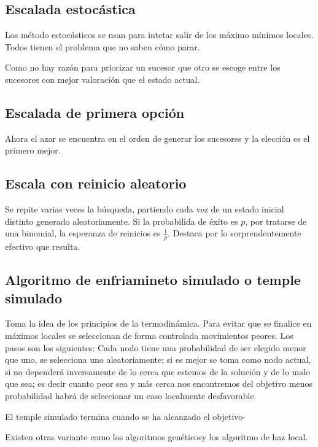 \documentclass[12 pt, a4paper]{article}
\begin{document}
  \subsection{Escalada estocástica}

  Los método estocásticos se usan para intetar salir de los máximo mínimos locales. Todos tienen el problema que no saben cómo parar. 

  Como no hay razón para priorizar un sucesor que otro se escoge entre los sucesores con mejor valoración que el estado actual. 

  \subsection{Escalada de primera opción}  
Ahora el azar se encuentra en el orden de generar los sucesores y la elección es el primero mejor. 

  \subsection{Escala con reinicio aleatorio}  

  Se repite varias veces la búsqueda, partiendo cada vez de un estado inicial distinto generado aleatoriamente. 
  Si la probabilida de éxito es $p$, por tratarse de una binomial, la esperanza de reinicios es $\frac{1}{p}.$ Destaca por lo sorprendentemente
  efectivo que resulta. 

  \subsection{Algoritmo de enfriamineto simulado o temple simulado}  

  Toma la idea de los principios de la termodinámica. 
  Para evitar que se finalice en máximos locales se seleccionan de forma controlada
  movimientos peores. 
  Los pasos son los siguientes: 
  Cada nodo tiene una probabilidad de ser elegido menor que uno, 
  se selecciona uno aleatoriamente; si es mejor se toma como nodo actual, si no
  dependerá inversamente de lo cerca que estemos de la solución y de lo malo que sea; es decir
  cuanto peor sea y más cerca nos encontremos del objetivo menos probabilidad habrá de seleccionar un caso
  localmente desfavorable.

  El temple simulado termina cuando se ha alcanzado el objetivo-


  Existen otras variante como los algoritmos genéticosy los algoritmo de haz local. 
\end{document}

